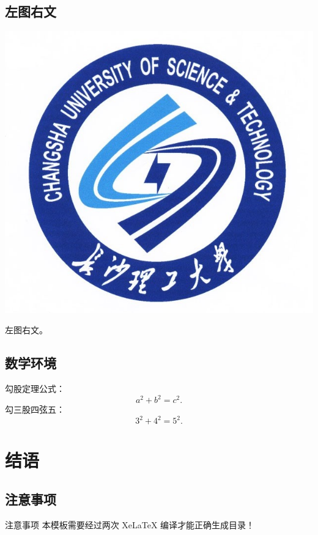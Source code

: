 \documentclass[dvipsnames, svgnames, x11names]{beamer}
\begin{document}
\subsection{左图右文}
\begin{frame}
    \begin{minipage}{.4\linewidth}
    \includegraphics[width=\linewidth]{../figure/csustlogo_626by572.jpg}
    \end{minipage}
    \quad
    \begin{minipage}{.55\linewidth}
        左图右文。
    \end{minipage}
\end{frame}

\subsection{数学环境}
\begin{frame}
    勾股定理公式：
    \[
        a^2+b^2=c^2.
    \]
    勾三股四弦五：
    \[
        3^2+4^2=5^2.
    \]
\end{frame}

\section{结语}
\subsection{注意事项}
\begin{frame}{注意事项}
    本模板需要经过\alert{两次 XeLaTeX 编译}才能正确生成目录！
\end{frame}
\end{document}
